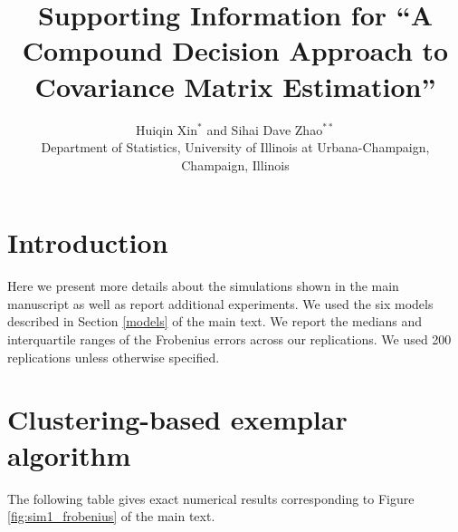 \documentclass[useAMS,referee,usenatbib]{biom}
\title[Supporting Information]{Supporting Information for ``A Compound Decision Approach to Covariance Matrix Estimation''}
\author{Huiqin Xin$^{*}$\email{huiqinx2@illinois.edu } and
Sihai Dave Zhao$^{**}$\email{sdzhao@illinois.edu} \\
Department of Statistics, University of Illinois at Urbana-Champaign, Champaign, Illinois}
\begin{document}
\maketitle

\section{Introduction} 
Here we present more details about the simulations shown in the main manuscript as well as report additional experiments. We used the six models described in Section \ref{models} of the main text. We report the medians and interquartile ranges of the Frobenius errors across our replications. We used 200 replications unless otherwise specified.

\section{Clustering-based exemplar algorithm}

The following table gives exact numerical results corresponding to Figure \ref{fig:sim1_frobenius} of the main text.
\end{document}
